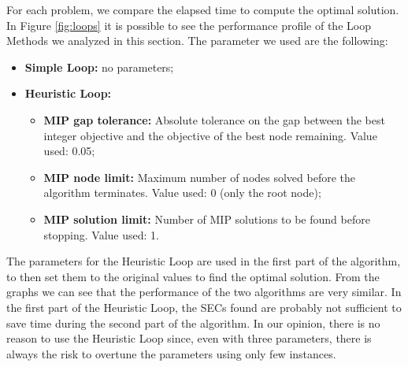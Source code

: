 \noindent
For each problem, we compare the elapsed time to compute the optimal solution.\\
In Figure \ref{fig:loops} it is possible to see the performance profile of the Loop Methods we analyzed in this section.
The parameter we used are the following:
\begin{itemize}
 	\item \textbf{Simple Loop:} no parameters;
	\item \textbf{Heuristic Loop:} 
	\begin{itemize} 
		\item \textbf{MIP gap tolerance:} Absolute tolerance on the gap between the best integer objective and the objective of the best node remaining. Value used: 0.05;
		\item \textbf{MIP node limit:} Maximum number of nodes solved before the algorithm terminates. Value used: 0 (only the root node);
		\item \textbf{MIP solution limit:} Number of MIP solutions to be found before stopping. Value used: 1.
		\end{itemize}
\end{itemize}
The parameters for the Heuristic Loop are used in the first part of the algorithm, to then set them to the original values to find the optimal solution.
From the graphs we can see that the performance of the two algorithms are very similar.  In the first part of the Heuristic Loop, the SECs found are probably not sufficient to save time during the second part of the algorithm. In our opinion, there is no reason to use the Heuristic Loop since, even with three parameters, there is always the risk to overtune the parameters using only few instances.

